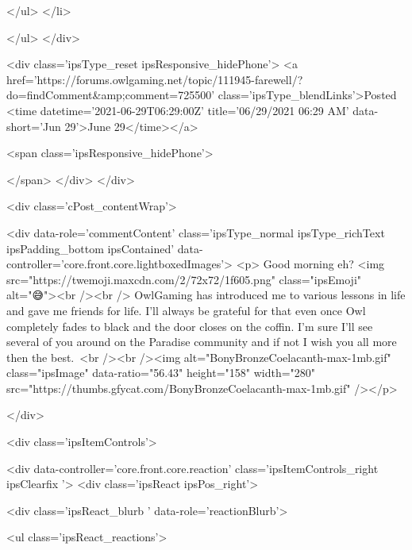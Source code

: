                         
						
						
						
							
								
							
							
							
							
							
							
						
					</ul>
				</li>
				
			</ul>
		</div>

		<div class='ipsType_reset ipsResponsive_hidePhone'>
			<a href='https://forums.owlgaming.net/topic/111945-farewell/?do=findComment&amp;comment=725500' class='ipsType_blendLinks'>Posted <time datetime='2021-06-29T06:29:00Z' title='06/29/2021 06:29  AM' data-short='Jun 29'>June 29</time></a> 
			
			<span class='ipsResponsive_hidePhone'>
				
				
			</span>
		</div>
	</div>

	

    

	<div class='cPost_contentWrap'>
		
		<div data-role='commentContent' class='ipsType_normal ipsType_richText ipsPadding_bottom ipsContained' data-controller='core.front.core.lightboxedImages'>
			<p>
	Good morning eh? <img src="https://twemoji.maxcdn.com/2/72x72/1f605.png" class="ipsEmoji" alt="😅"><br /><br />
	OwlGaming has introduced me to various lessons in life and gave me friends for life. I'll always be grateful for that even once Owl completely fades to black and the door closes on the coffin. I'm sure I'll see several of you around on the Paradise community and if not I wish you all more then the best. <br /><br /><img alt="BonyBronzeCoelacanth-max-1mb.gif" class="ipsImage" data-ratio="56.43" height="158" width="280" src="https://thumbs.gfycat.com/BonyBronzeCoelacanth-max-1mb.gif" /></p>


			
		</div>

		
			<div class='ipsItemControls'>
				
					
						

	<div data-controller='core.front.core.reaction' class='ipsItemControls_right ipsClearfix '>	
		<div class='ipsReact ipsPos_right'>
			
				
				<div class='ipsReact_blurb ' data-role='reactionBlurb'>
					
						

	
	<ul class='ipsReact_reactions'>
		
